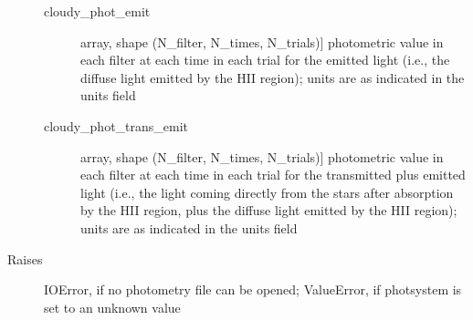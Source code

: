\documentclass[letterpaper,10pt,english]{sphinxmanual}
\begin{document}
\begin{fulllineitems}
\begin{description}
\begin{description}
\item[{cloudy\_phot\_emit}] \leavevmode{[}array, shape (N\_filter, N\_times, N\_trials){]}
photometric value in each filter at each time in each trial for
the emitted light (i.e., the diffuse light emitted by the HII
region); units are as indicated in the units field

\item[{cloudy\_phot\_trans\_emit}] \leavevmode{[}array, shape (N\_filter, N\_times, N\_trials){]}
photometric value in each filter at each time in each trial for
the transmitted plus emitted light (i.e., the light coming
directly from the stars after absorption by the HII region,
plus the diffuse light emitted by the HII region); units are as
indicated in the units field

\end{description}

\item[{Raises}] \leavevmode
IOError, if no photometry file can be opened;
ValueError, if photsystem is set to an unknown value

\end{description}

\end{fulllineitems}

\end{document}
